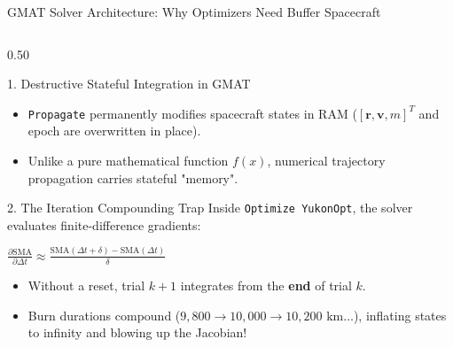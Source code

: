 \documentclass[aspectratio=169, 10pt]{beamer}
\begin{document}
\begin{frame}{GMAT Solver Architecture: Why Optimizers Need Buffer Spacecraft}
    \begin{columns}[T]
        \begin{column}{0.50\textwidth}
            \begin{block}{1. Destructive Stateful Integration in GMAT}
                \scriptsize
                \begin{itemize}\setlength{\itemsep}{1.5pt}\setlength{\topsep}{0pt}
                    \item \texttt{Propagate} permanently modifies spacecraft states in RAM ($[\mathbf{r}, \mathbf{v}, m]^T$ and epoch are overwritten in place).
                    \item Unlike a pure mathematical function $f(x)$, numerical trajectory propagation carries stateful "memory".
                \end{itemize}
            \end{block}
            \vspace{-0.15cm}
            \begin{alertblock}{2. The Iteration Compounding Trap}
                \scriptsize
                Inside \texttt{Optimize YukonOpt}, the solver evaluates finite-difference gradients:
                \par\vspace{1pt}
                {\centering $\displaystyle \frac{\partial \text{SMA}}{\partial \Delta t} \approx \frac{\text{SMA}(\Delta t + \delta) - \text{SMA}(\Delta t)}{\delta}$ \par}
                \vspace{1pt}
                \begin{itemize}\setlength{\itemsep}{1pt}\setlength{\topsep}{0pt}
                    \item Without a reset, trial $k+1$ integrates from the \textbf{end} of trial $k$.
                    \item Burn durations compound ($9,800 \to 10,000 \to 10,200\text{ km}\dots$), inflating states to infinity and blowing up the Jacobian!
                \end{itemize}
            \end{alertblock}
        \end{column}


\end{columns}
\end{frame}
\end{document}

